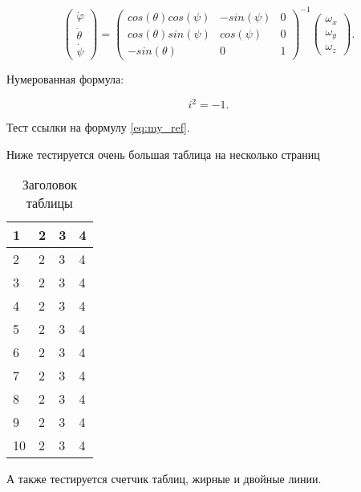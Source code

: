 \documentclass[a4paper,article,14pt]{extarticle}
\begin{document}
\begin{equation}
    \begin{pmatrix} \dot{\varphi}\\ \dot{\theta} \\ \dot{\psi} \end{pmatrix}
    = \begin{pmatrix}
        cos(\theta)cos(\psi) & -sin(\psi) & 0 \\
        cos(\theta)sin(\psi) & cos(\psi)  & 0 \\
        -sin(\theta)         & 0         &  1
    \end{pmatrix}^{-1}
    \begin{pmatrix} \omega_x\\ \omega_y \\ \omega_z \end{pmatrix}.
\end{equation}

Нумерованная формула:

\begin{equation}
    i^2 = -1.
    \label{eq:my_ref}
\end{equation}

Тест ссылки на формулу \ref{eq:my_ref}.

Ниже тестируется очень большая таблица на несколько страниц

\begin{center}
    \begin{longtable}{|p{2cm}|p{3cm}|p{7cm}|p{3cm}|}
    \caption{Заголовок таблицы}\\
    \hline
    1 & 2 & 3 & 4\\
    \hline
    2 & 2 & 3 & 4\\
    \hline
    3 & 2 & 3 & 4\\
    \hline
    4 & 2 & 3 & 4\\
    \hline
    5 & 2 & 3 & 4\\
    \hline
    6 & 2 & 3 & 4\\
    \hline
    7 & 2 & 3 & 4\\
    \hline
    8 & 2 & 3 & 4\\
    \hline
    9 & 2 & 3 & 4\\
    \hline
    10 & 2 & 3 & 4\\
    \hline


    \end{longtable}
\end{center}


А также тестируется счетчик таблиц, жирные и двойные линии.
\end{document}
